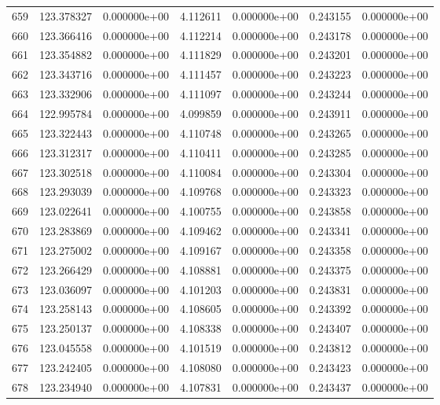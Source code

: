 \begin{tabular}{rrrrrrr}
 659 & 123.378327 &  0.000000e+00 &  4.112611 &  0.000000e+00 &   0.243155 &  0.000000e+00 \\
 660 & 123.366416 &  0.000000e+00 &  4.112214 &  0.000000e+00 &   0.243178 &  0.000000e+00 \\
 661 & 123.354882 &  0.000000e+00 &  4.111829 &  0.000000e+00 &   0.243201 &  0.000000e+00 \\
 662 & 123.343716 &  0.000000e+00 &  4.111457 &  0.000000e+00 &   0.243223 &  0.000000e+00 \\
 663 & 123.332906 &  0.000000e+00 &  4.111097 &  0.000000e+00 &   0.243244 &  0.000000e+00 \\
 664 & 122.995784 &  0.000000e+00 &  4.099859 &  0.000000e+00 &   0.243911 &  0.000000e+00 \\
 665 & 123.322443 &  0.000000e+00 &  4.110748 &  0.000000e+00 &   0.243265 &  0.000000e+00 \\
 666 & 123.312317 &  0.000000e+00 &  4.110411 &  0.000000e+00 &   0.243285 &  0.000000e+00 \\
 667 & 123.302518 &  0.000000e+00 &  4.110084 &  0.000000e+00 &   0.243304 &  0.000000e+00 \\
 668 & 123.293039 &  0.000000e+00 &  4.109768 &  0.000000e+00 &   0.243323 &  0.000000e+00 \\
 669 & 123.022641 &  0.000000e+00 &  4.100755 &  0.000000e+00 &   0.243858 &  0.000000e+00 \\
 670 & 123.283869 &  0.000000e+00 &  4.109462 &  0.000000e+00 &   0.243341 &  0.000000e+00 \\
 671 & 123.275002 &  0.000000e+00 &  4.109167 &  0.000000e+00 &   0.243358 &  0.000000e+00 \\
 672 & 123.266429 &  0.000000e+00 &  4.108881 &  0.000000e+00 &   0.243375 &  0.000000e+00 \\
 673 & 123.036097 &  0.000000e+00 &  4.101203 &  0.000000e+00 &   0.243831 &  0.000000e+00 \\
 674 & 123.258143 &  0.000000e+00 &  4.108605 &  0.000000e+00 &   0.243392 &  0.000000e+00 \\
 675 & 123.250137 &  0.000000e+00 &  4.108338 &  0.000000e+00 &   0.243407 &  0.000000e+00 \\
 676 & 123.045558 &  0.000000e+00 &  4.101519 &  0.000000e+00 &   0.243812 &  0.000000e+00 \\
 677 & 123.242405 &  0.000000e+00 &  4.108080 &  0.000000e+00 &   0.243423 &  0.000000e+00 \\
 678 & 123.234940 &  0.000000e+00 &  4.107831 &  0.000000e+00 &   0.243437 &  0.000000e+00 \\

\end{tabular}
